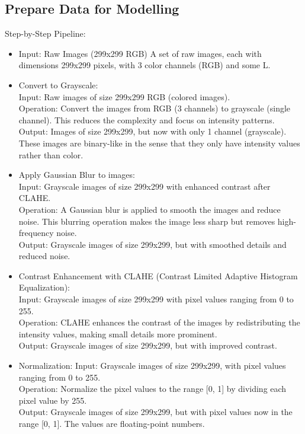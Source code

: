 \documentclass{article}
\begin{document}
\subsection{Prepare Data for Modelling}
Step-by-Step Pipeline:
\begin{itemize}
    \item Input: Raw Images (299x299 RGB)
A set of raw images, each with dimensions 299x299 pixels, with 3 color channels (RGB) and some L.
    \item Convert to Grayscale: \\Input: Raw images of size 299x299 RGB (colored images).\\
    Operation: Convert the images from RGB (3 channels) to grayscale (single channel). This reduces the complexity and focus on intensity patterns.\\
    Output: Images of size 299x299, but now with only 1 channel (grayscale). These images are binary-like in the sense that they only have intensity values rather than color.
    \item Apply Gaussian Blur to images:\\
    Input: Grayscale images of size 299x299 with enhanced contrast after CLAHE.\\
    Operation: A Gaussian blur is applied to smooth the images and reduce noise. This blurring operation makes the image less sharp but removes high-frequency noise.\\
    Output: Grayscale images of size 299x299, but with smoothed details and reduced noise.\\
    \item Contrast Enhancement with CLAHE (Contrast Limited Adaptive Histogram Equalization):\\
    Input: Grayscale images of size 299x299 with pixel values ranging from 0 to 255.\\
    Operation: CLAHE enhances the contrast of the images by redistributing the intensity values, making small details more prominent.\\
    Output: Grayscale images of size 299x299, but with improved contrast.\\
    \item Normalization:
    Input: Grayscale images of size 299x299, with pixel values ranging from 0 to 255.\\
    Operation: Normalize the pixel values to the range [0, 1] by dividing each pixel value by 255.\\
    Output: Grayscale images of size 299x299, but with pixel values now in the range [0, 1]. The values are floating-point numbers.\\

\end{itemize}
\end{document}

